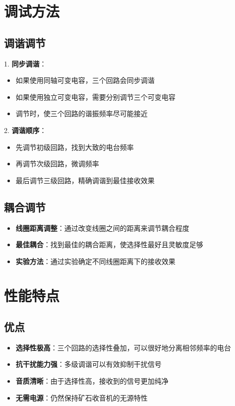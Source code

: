 \documentclass[12pt,UTF8]{ctexbook}
\begin{document}
\section{调试方法}

\subsection{调谐调节}

1. \textbf{同步调谐}：
   \begin{itemize}[leftmargin=3.5em]
   \item 如果使用同轴可变电容，三个回路会同步调谐
   \item 如果使用独立可变电容，需要分别调节三个可变电容
   \item 调节时，使三个回路的谐振频率尽可能接近
   \end{itemize}

2. \textbf{调谐顺序}：
   \begin{itemize}[leftmargin=3.5em]
   \item 先调节初级回路，找到大致的电台频率
   \item 再调节次级回路，微调频率
   \item 最后调节三级回路，精确调谐到最佳接收效果
   \end{itemize}

\subsection{耦合调节}

\begin{itemize}[leftmargin=3.5em]
    \item \textbf{线圈距离调整}：通过改变线圈之间的距离来调节耦合程度
    \item \textbf{最佳耦合}：找到最佳的耦合距离，使选择性最好且灵敏度足够
    \item \textbf{实验方法}：通过实验确定不同线圈距离下的接收效果
\end{itemize}

\section{性能特点}

\subsection{优点}

\begin{itemize}[leftmargin=3.5em]
    \item \textbf{选择性极高}：三个回路的选择性叠加，可以很好地分离相邻频率的电台
    \item \textbf{抗干扰能力强}：多级调谐可以有效抑制干扰信号
    \item \textbf{音质清晰}：由于选择性高，接收到的信号更加纯净
    \item \textbf{无需电源}：仍然保持矿石收音机的无源特性
\end{itemize}
\end{document}
